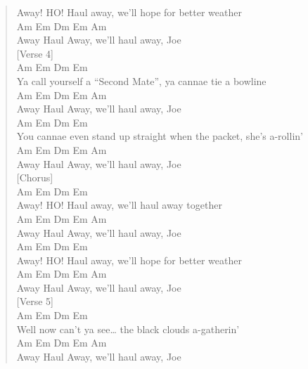 \documentclass[11pt]{article}
\begin{document}
\begin{verse}
Away! HO! Haul away, we'll hope for better weather\\
Am         Em         Dm   Em    Am\\
Away Haul Away, we'll haul away, Joe\\
\vspace*{1em}
\vspace*{1em}
[Verse 4]\\
\hspace*{3em}Am               Em               Dm           Em\\
Ya call yourself a ``Second Mate'', ya cannae tie a bowline\\
Am         Em         Dm   Em    Am\\
Away Haul Away, we'll haul away, Joe\\
\hspace*{5em}Am          Em                         Dm            Em\\
You cannae even stand up straight when the packet, she's a-rollin'\\
Am         Em         Dm   Em    Am\\
Away Haul Away, we'll haul away, Joe\\
\vspace*{1em}
\vspace*{1em}
[Chorus]\\
Am        Em              Dm          Em\\
Away! HO! Haul away, we'll haul away together\\
Am         Em         Dm   Em    Am\\
Away Haul Away, we'll haul away, Joe\\
Am        Em               Dm              Em\\
Away! HO! Haul away, we'll hope for better weather\\
Am         Em         Dm   Em    Am\\
Away Haul Away, we'll haul away, Joe\\
\vspace*{1em}
\vspace*{1em}
[Verse 5]\\
\hspace*{3em}Am             Em          Dm           Em\\
Well now can't ya see\ldots{} the black clouds a-gatherin'\\
Am         Em         Dm   Em    Am\\
Away Haul Away, we'll haul away, Joe\\

\end{verse}
\end{document}

